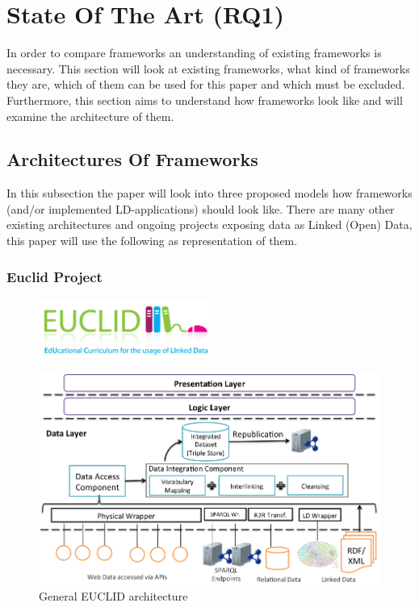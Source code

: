 \chapter{State Of The Art (RQ1)}
In order to compare frameworks an understanding of existing frameworks is necessary. This section will look at existing frameworks, what kind of frameworks they are, which of them can be used for this paper and which must be excluded. Furthermore, this section aims to understand how frameworks look like and will examine the architecture of them.

\section{Architectures Of Frameworks}\label{arch_frameworks}
In this subsection the paper will look into three proposed models how frameworks (and/or implemented LD-applications) should look like. There are many other existing architectures and ongoing projects exposing data as Linked (Open) Data, this paper will use the following as representation of them.

\subsection{Euclid Project}

\begin{figure}[h]
	\centering
\includegraphics[width=0.5\textwidth]{img/euclid_logo.png}
\end{figure}

\begin{figure}[htbp]
	\centering
\includegraphics[width=1\textwidth]{img/euclid_architecture.png}
	\caption{General EUCLID architecture}
	\label{euclid_architecture}
\end{figure}

